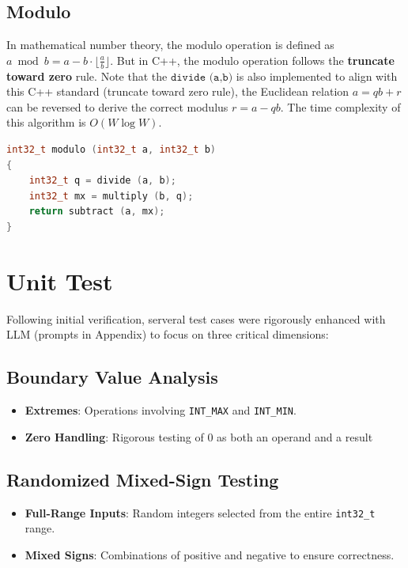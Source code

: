 \documentclass[11pt]{article}
\begin{document}
\subsection{Modulo}
In mathematical number theory, the modulo operation is defined as $a \bmod b = a - b \cdot \lfloor \frac{a}{b} \rfloor$. But in C++, the modulo operation follows the \textbf{truncate toward zero} rule.
\vspace{3pt}
Note that the $\texttt{divide (a,b)}$ is also implemented to align with this C++ standard (truncate toward zero rule), the Euclidean relation $a = qb + r$ can be reversed to derive the correct modulus $r = a - qb$.
\vspace{3pt}
The time complexity of this algorithm is \textbf{$O(W \log W)$}.
\vspace{8pt}
\begin{lstlisting}[language=C++]
int32_t modulo (int32_t a, int32_t b)
{
    int32_t q = divide (a, b);
    int32_t mx = multiply (b, q);
    return subtract (a, mx);
}
\end{lstlisting}
\section{Unit Test}

Following initial verification, serveral test cases were rigorously enhanced with LLM (prompts in Appendix) to focus on three critical dimensions:

\subsection{Boundary Value Analysis}
\begin{itemize}
    \item \textbf{Extremes}: Operations involving \texttt{INT\_MAX} and \texttt{INT\_MIN}.
    \item \textbf{Zero Handling}: Rigorous testing of $0$ as both an operand and a result 
    \end{itemize}

\subsection{Randomized Mixed-Sign Testing}
\begin{itemize}
    \item \textbf{Full-Range Inputs}: Random integers selected from the entire \texttt{int32\_t} range.
    \item \textbf{Mixed Signs}: Combinations of positive and negative to ensure correctness.
\end{itemize}
\end{document}
